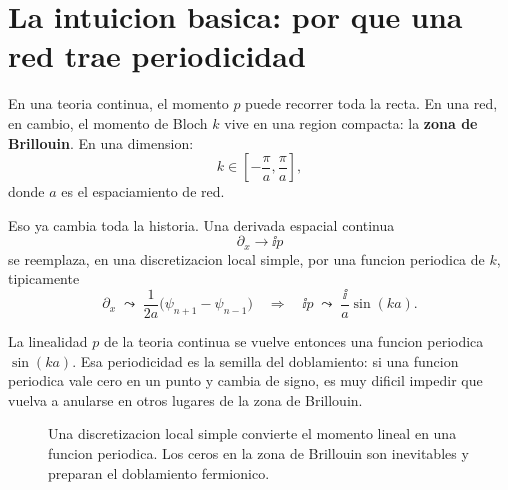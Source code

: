 \section{La intuicion basica: por que una red trae periodicidad}

En una teoria continua, el momento \(p\) puede recorrer toda la recta. En una red, en cambio, el momento de Bloch \(k\) vive en una region compacta: la \textbf{zona de Brillouin}. En una dimension:
\begin{equation}
k \in \left[-\frac{\pi}{a},\frac{\pi}{a}\right],
\end{equation}
donde \(a\) es el espaciamiento de red.

Eso ya cambia toda la historia. Una derivada espacial continua
\begin{equation}
\partial_x \longrightarrow \ii p
\end{equation}
se reemplaza, en una discretizacion local simple, por una funcion periodica de \(k\), tipicamente
\begin{equation}
\partial_x \;\leadsto\; \frac{1}{2a}\bigl(\psi_{n+1}-\psi_{n-1}\bigr)
\quad\Longrightarrow\quad
\ii p \;\leadsto\; \frac{\ii}{a}\sin(ka).
\end{equation}

La linealidad \(p\) de la teoria continua se vuelve entonces una funcion periodica \(\sin(ka)\). Esa periodicidad es la semilla del doblamiento: si una funcion periodica vale cero en un punto y cambia de signo, es muy dificil impedir que vuelva a anularse en otros lugares de la zona de Brillouin.

\begin{figure}[ht]
\centering
{}
\caption{Una discretizacion local simple convierte el momento lineal en una funcion periodica. Los ceros en la zona de Brillouin son inevitables y preparan el doblamiento fermionico.}
\label{c26:fig:sin-periodic}
\end{figure}


